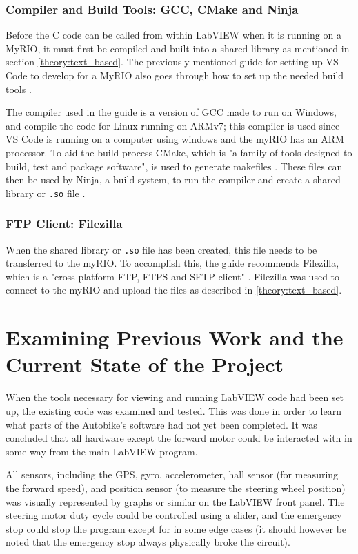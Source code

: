 \subsubsection{Compiler and Build Tools: GCC, CMake and Ninja}

Before the C code can be called from within LabVIEW when it is running on a MyRIO, it must first be compiled and built into a shared library as mentioned in section \ref{theory:text_based}. The previously mentioned guide for setting up VS Code to develop for a MyRIO also goes through how to set up the needed build tools \cite{J2020NICode}. 

The compiler used in the guide is a version of GCC made to run on Windows, and compile the code for Linux running on ARMv7; this compiler is used since VS Code is running on a computer using windows and the myRIO has an ARM processor. To aid the build process CMake, which is "a family of tools designed to build, test and package software", is used to generate makefiles \cite{Kitware2022CMake}. These files can then be used by Ninja, a build system, to run the compiler and create a shared library or \texttt{.so} file \cite{Hasse2022NinjaSpeed}.

\subsubsection{FTP Client: Filezilla}

When the shared library or \texttt{.so} file has been created, this file needs to be transferred to the myRIO. To accomplish this, the guide recommends Filezilla, which is a "cross-platform FTP, FTPS and SFTP client" \cite{FileZilla2022ClientFeatures}. Filezilla was used to connect to the myRIO and upload the files as described in \ref{theory:text_based}.

\section{Examining Previous Work and the Current State of the Project}

When the tools necessary for viewing and running LabVIEW code had been set up, the existing code was examined and tested. This was done in order to learn what parts of the Autobike's software had not yet been completed. It was concluded that all hardware except the forward motor could be interacted with in some way from the main LabVIEW program. 

All sensors, including the GPS, gyro, accelerometer, hall sensor (for measuring the forward speed), and position sensor (to measure the steering wheel position) was visually represented by graphs or similar on the LabVIEW front panel. The steering motor duty cycle could be controlled using a slider, and the emergency stop could stop the program except for in some edge cases (it should however be noted that the emergency stop always physically broke the circuit).

